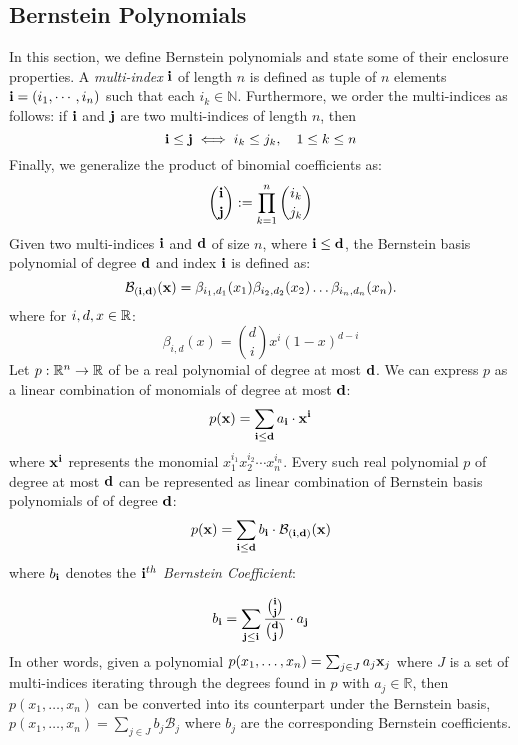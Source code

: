\subsection{Bernstein Polynomials}
\label{sec:bernstein}
In this section, we define Bernstein polynomials and state some of their enclosure properties. A \emph{multi-index} ${\bf i}$ of length $n$ is defined as tuple of $n$ elements ${\bf i} = (i_1,\cdots, i_n)$ such that each $i_k \in \mathbb{N}$. Furthermore, we order the multi-indices as follows: if ${\bf i}$ and ${\bf j}$ are two multi-indices of length $n$, then
\[
  {\bf i} \leq {\bf j} \iff i_k \leq j_k, \quad 1 \leq  k \leq n
\]
Finally, we generalize the product of binomial coefficients as:
\[
  \binom{{\bf i}}{{\bf j}} := \prod_{k=1}^n \binom{i_k}{j_k}
\]
%
Given two multi-indices ${\bf i}$ and ${\bf d}$ of size $n$, where ${\bf i} \leq {\bf d}$, the Bernstein basis polynomial of degree ${\bf d}$ and index ${\bf i}$ is defined as:
\begin{equation}
\label{eq:bernstein_basis_poly}
\mathcal{B}_{({\bf i},{\bf d})}({\bf x}) = \beta_{i_1,d_1}(x_1) \beta_{i_2,d_2}(x_2)\ldots \beta_{i_n,d_n}(x_n).
\end{equation}
%
where for $i,d,x \in {\mathbb{R}}$:
%
\begin{equation}
\beta_{i,d}(x) = \binom{d}{i}x^{i}(1-x)^{d - i}
\end{equation}
%
Let $p: {\mathbb{R}}^n \rightarrow {\mathbb{R}}$ of be a real polynomial of degree at most ${\bf d}$. We can express $p$ as a linear combination of monomials of degree at most ${\bf d}$:
\[
p({\bf x}) = \sum_{{\bf i} \leq {\bf d}} a_{\bf i} \cdot {\bf x}^{\bf i}
\]
where ${\bf x}^{\bf i}$ represents the monomial $x_1^{i_1}x_2^{i_2}\cdots x_n^{i_n}$. Every such real polynomial $p$ of degree at most ${\bf d}$ can be represented as linear combination of Bernstein basis polynomials of of degree ${\bf d}$:
%
\begin{equation}
  \label{eq:bernstein_coeff}
  p({\bf x}) = \sum_{{\bf i} \leq {\bf d}} b_{{\bf i}} \cdot \mathcal{B}_{({\bf i},{\bf d})}({\bf x})
\end{equation}
where $b_{\bf i}$ denotes the \emph{${\bf i}^{th}$ Bernstein Coefficient}:

\begin{equation}
b_{{\bf i}} = \sum_{{\bf j} \leq {\bf i}} \frac{\binom{{\bf i}}{{\bf j}}}{\binom{{\bf d}}{{\bf j}}}\cdot a_{{\bf j}}
\end{equation}
%
\noindent In other words, given a polynomial $p(x_1,\ldots,x_n) = \sum_{j \in J} a_j {\bf x}_{j}$ where $J$ is a set of multi-indices iterating through the degrees found in $p$ with $a_j \in \mathbb{R}$, then $p(x_1,\ldots,x_n)$ can be converted into its counterpart under the Bernstein basis, $p(x_1,\ldots,x_n) = \sum_{j \in J} b_j \mathcal{B}_j $ where $b_j$ are the corresponding Bernstein coefficients.
%

